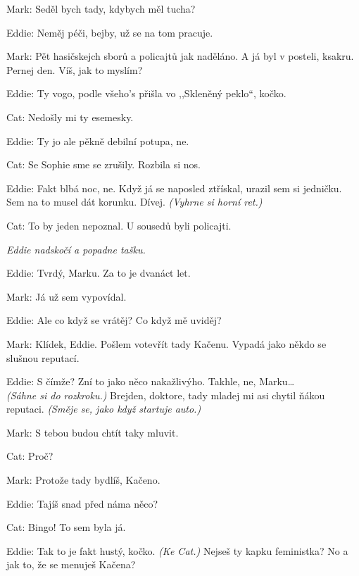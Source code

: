 \medskip
\noindent
Mark: Seděl bych tady, kdybych měl tucha?

\medskip
\noindent
Eddie: Neměj péči, bejby, už se na tom pracuje.

\medskip
\noindent
Mark: Pět hasičskejch sborů a policajtů jak naděláno. A já byl v posteli, ksakru. Pernej den. Víš, jak to myslím?

\medskip
\noindent
Eddie:	Ty vogo, podle všeho's přišla vo ,,Skleněný peklo``, kočko.

\medskip
\noindent
Cat: Nedošly mi ty esemesky.

\medskip
\noindent
Eddie: Ty jo ale pěkně debilní potupa, ne.

\medskip
\noindent
Cat: Se Sophie sme se zrušily. Rozbila si nos.

\medskip
\noindent
Eddie: Fakt blbá noc, ne. Když já se naposled ztřískal, urazil sem si jedničku. Sem na to musel dát korunku. Dívej. \textit{(Vyhrne si horní ret.)}

\medskip
\noindent
Cat: To by jeden nepoznal. U sousedů byli policajti.

\medskip
\noindent
\textit{Eddie nadskočí a popadne tašku.}

\medskip
\noindent
Eddie: Tvrdý, Marku. Za to je dvanáct let.

\medskip
\noindent
Mark: Já už sem vypovídal.

\medskip
\noindent
Eddie: Ale co když se vrátěj? Co když mě uviděj?

\medskip
\noindent
Mark: Klídek, Eddie. Pošlem votevřít tady Kačenu. Vypadá jako někdo se slušnou reputací. 

\medskip
\noindent
Eddie:	S čímže? Zní to jako něco nakažlivýho. Takhle, ne, Marku\ldots \\ \textit{(Sáhne si do rozkroku.)} Brejden, doktore, tady mladej mi asi chytil ňákou reputaci. \textit{(Směje se, jako když startuje auto.)}

\medskip
\noindent
Mark: S tebou budou chtít taky mluvit.

\medskip
\noindent
Cat: Proč?

\medskip
\noindent
Mark: Protože tady bydlíš, Kačeno.

\medskip
\noindent
Eddie: Tajíš snad před náma něco?

\medskip
\noindent
Cat: Bingo! To sem byla já.

\medskip
\noindent
Eddie: Tak to je fakt hustý, kočko. \textit{(Ke Cat.)} Nejseš ty kapku feministka?
No a jak to, že se menuješ Kačena?

